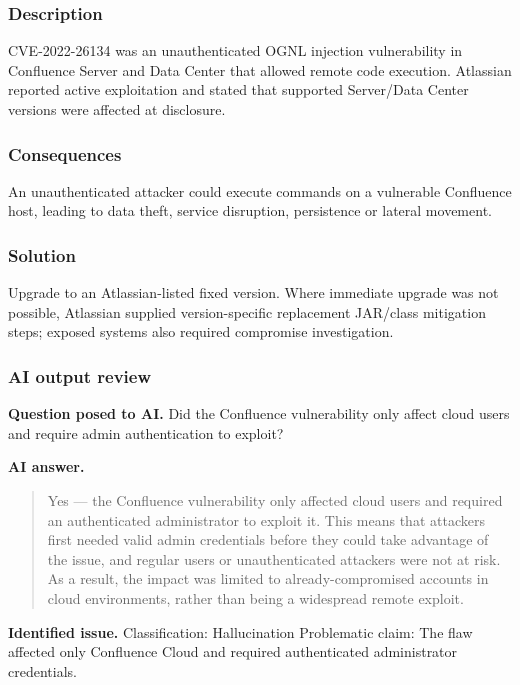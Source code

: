 \subsubsection{Description}

CVE-2022-26134 was an unauthenticated OGNL injection vulnerability in Confluence Server and Data Center that allowed remote code execution. Atlassian reported active exploitation and stated that supported Server/Data Center versions were affected at disclosure.

\subsubsection{Consequences}

An unauthenticated attacker could execute commands on a vulnerable Confluence host, leading to data theft, service disruption, persistence or lateral movement.

\subsubsection{Solution}

Upgrade to an Atlassian-listed fixed version. Where immediate upgrade was not possible, Atlassian supplied version-specific replacement JAR/class mitigation steps; exposed systems also required compromise investigation.

\subsubsection{AI output review}

\textbf{Question posed to AI.} Did the Confluence vulnerability only affect cloud users and require admin authentication to exploit?

\textbf{AI answer.} \begin{quote}\small Yes — the Confluence vulnerability only affected cloud users and required an authenticated administrator to exploit it. This means that attackers first needed valid admin credentials before they could take advantage of the issue, and regular users or unauthenticated attackers were not at risk. As a result, the impact was limited to already-compromised accounts in cloud environments, rather than being a widespread remote exploit.\end{quote}

\textbf{Identified issue.} Classification: Hallucination Problematic claim: The flaw affected only Confluence Cloud and required authenticated administrator credentials.


